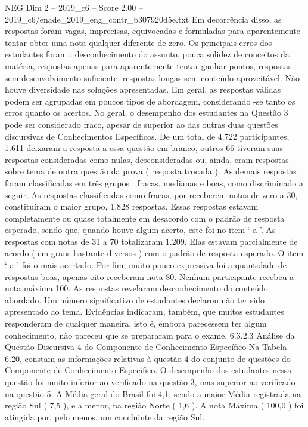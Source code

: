 \begin{textsample}{NEG Dim 2 – 2019\_c6 – Score 2.00 – 2019\_c6/enade\_2019\_eng\_contr\_b307920d5e.txt}
Em decorrência disso, as respostas foram vagas, imprecisas, equivocadas e formuladas para aparentemente tentar obter uma nota qualquer diferente de zero.
Os principais erros dos estudantes foram : desconhecimento do assunto, pouca solidez de conceitos da matéria, respostas apenas para aparentemente tentar ganhar pontos, respostas sem desenvolvimento suficiente, respostas longas sem conteúdo aproveitável.
Não houve diversidade nas soluções apresentadas.
Em geral, as respostas válidas podem ser agrupadas em poucos tipos de abordagem, considerando -se tanto os erros quanto os acertos.
No geral, o desempenho dos estudantes na Questão 3 pode ser considerado fraco, apesar de superior ao das outras duas questões discursivas de Conhecimentos Específicos.
De um total de 4.722 participantes, 1.611 deixaram a resposta a essa questão em branco, outros 66 tiveram suas respostas consideradas como nulas, desconsideradas ou, ainda, eram respostas sobre tema de outra questão da prova ( resposta trocada ).
As demais respostas foram classificadas em três grupos : fracas, medianas e boas, como discriminado a seguir.
As respostas classificadas como fracas, por receberem notas de zero a 30, constituíram o maior grupo, 1.828 respostas.
Essas respostas estavam completamente ou quase totalmente em desacordo com o padrão de resposta esperado, sendo que, quando houve algum acerto, este foi no item ‘ a ’.
As respostas com notas de 31 a 70 totalizaram 1.209.
Elas estavam parcialmente de acordo ( em graus bastante diversos ) com o padrão de resposta esperado.
O item ‘ a ’ foi o mais acertado.
Por fim, muito pouco expressiva foi a quantidade de respostas boas, apenas oito receberam nota 80.
Nenhum participante recebeu a nota máxima 100.
As respostas revelaram desconhecimento do conteúdo abordado.
Um número significativo de estudantes declarou não ter sido apresentado ao tema.
Evidências indicaram, também, que muitos estudantes responderam de qualquer maneira, isto é, embora parecessem ter algum conhecimento, não pareceu que se prepararam para o exame. 6.3.2.3 Análise da Questão Discursiva 4 do Componente de Conhecimento Específico Na Tabela 6.20, constam as informações relativas à questão 4 do conjunto de questões do Componente de Conhecimento Específico.
O desempenho dos estudantes nessa questão foi muito inferior ao verificado na questão 3, mas superior ao verificado na questão 5.
A Média geral do Brasil foi 4,1, sendo a maior Média registrada na região Sul ( 7,5 ), e a menor, na região Norte ( 1,6 ).
A nota Máxima ( 100,0 ) foi atingida por, pelo menos, um concluinte da região Sul.

\end{textsample}
